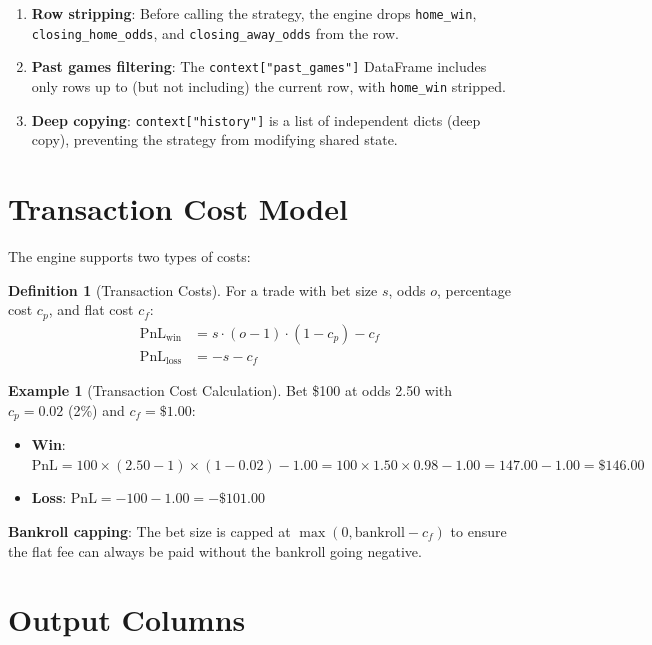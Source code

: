 \documentclass[12pt,a4paper]{report}
\theoremstyle{definition}
\newtheorem{definition}{Definition}[chapter]
\newtheorem{example}{Example}[chapter]
\newcommand{\code}[1]{\texttt{#1}}
\newcommand{\pnl}{\text{PnL}}
\begin{document}
\begin{enumerate}
    \item \textbf{Row stripping}: Before calling the strategy, the engine drops \code{home\_win}, \code{closing\_home\_odds}, and \code{closing\_away\_odds} from the row.
    \item \textbf{Past games filtering}: The \code{context["past\_games"]} DataFrame includes only rows up to (but not including) the current row, with \code{home\_win} stripped.
    \item \textbf{Deep copying}: \code{context["history"]} is a list of independent dicts (deep copy), preventing the strategy from modifying shared state.
\end{enumerate}

\section{Transaction Cost Model}
\label{sec:costs}

The engine supports two types of costs:

\begin{definition}[Transaction Costs]
For a trade with bet size $s$, odds $o$, percentage cost $c_p$, and flat cost $c_f$:
\begin{align}
    \pnl_{\text{win}}  &= s \cdot (o - 1) \cdot (1 - c_p) - c_f \label{eq:pnl-win} \\
    \pnl_{\text{loss}} &= -s - c_f \label{eq:pnl-loss}
\end{align}
\end{definition}

\begin{example}[Transaction Cost Calculation]
Bet \$100 at odds 2.50 with $c_p = 0.02$ (2\%) and $c_f = \$1.00$:
\begin{itemize}
    \item \textbf{Win}: $\pnl = 100 \times (2.50 - 1) \times (1 - 0.02) - 1.00 = 100 \times 1.50 \times 0.98 - 1.00 = 147.00 - 1.00 = \$146.00$
    \item \textbf{Loss}: $\pnl = -100 - 1.00 = -\$101.00$
\end{itemize}
\end{example}

\textbf{Bankroll capping}: The bet size is capped at $\max(0, \text{bankroll} - c_f)$ to ensure the flat fee can always be paid without the bankroll going negative.

\section{Output Columns}
\label{sec:output-columns}
\end{document}
